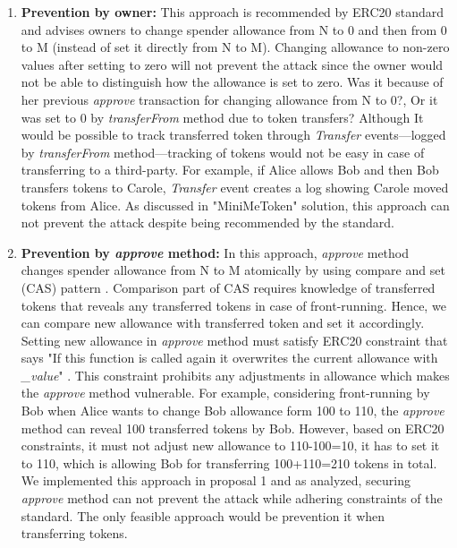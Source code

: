 \begin{enumerate}[label=\Alph*.]
	\item \textbf{Prevention by owner:} This approach is recommended by ERC20 standard \cite{Ref08} and advises owners to change spender allowance from N to 0 and then from 0 to M (instead of set it directly from N to M). Changing allowance to non-zero values after setting to zero will not prevent the attack since the owner would not be able to distinguish how the allowance is set to zero. Was it because of her previous \textit{approve} transaction for changing allowance from N to 0?, Or it was set to 0 by \textit{transferFrom} method due to token transfers? Although It would be possible to track transferred token through \textit{Transfer} events---logged by \textit{transferFrom} method---tracking of tokens would not be easy in case of transferring to a third-party. For example, if Alice allows Bob and then Bob transfers tokens to Carole, \textit{Transfer} event creates a log showing Carole moved tokens from Alice. As discussed in "MiniMeToken" solution, this approach can not prevent the attack despite being recommended by the standard.
	
	\item \textbf{Prevention by \textit{approve} method:} In this approach, \textit{approve} method changes spender allowance from N to M atomically by using compare and set (CAS) pattern \cite{Ref06}. Comparison part of CAS requires knowledge of transferred tokens that reveals any transferred tokens in case of front-running. Hence, we can compare new allowance with transferred token and set it accordingly. Setting new allowance in \textit{approve} method must satisfy ERC20 constraint that says "If this function is called again it overwrites the current allowance with \textit{\_value}" \cite{Ref08}. This constraint prohibits any adjustments in allowance which makes the \textit{approve} method vulnerable. For example, considering front-running by Bob when Alice wants to change Bob allowance form 100 to 110, the \textit{approve} method can reveal 100 transferred tokens by Bob. However, based on ERC20 constraints, it must not adjust new allowance to 110-100=10, it has to set it to 110, which is allowing Bob for transferring 100+110=210 tokens in total. We implemented this approach in proposal 1 and as analyzed, securing \textit{approve} method can not prevent the attack while adhering constraints of the standard. The only feasible approach would be prevention it when transferring tokens.
	

\end{enumerate}
